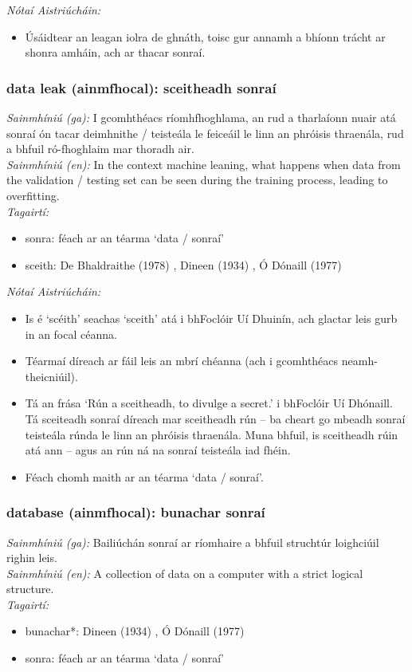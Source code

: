  \noindent \textit{Nótaí Aistriúcháin:}
\begin{itemize}
	\item Úsáidtear an leagan iolra de ghnáth, toisc gur annamh a bhíonn trácht ar shonra amháin, ach ar thacar sonraí.
\end{itemize}


\subsubsection*{data leak (ainmfhocal): sceitheadh sonraí}
 \noindent \textit{Sainmhíniú (ga):} I gcomhthéacs ríomhfhoghlama, an rud a tharlaíonn nuair atá sonraí ón tacar deimhnithe / teisteála le feiceáil le linn an phróisis thraenála, rud a bhfuil ró-fhoghlaim mar thoradh air.
\\
 \noindent \textit{Sainmhíniú (en):} In the context machine leaning, what happens when data from the validation / testing set can be seen during the training process, leading to overfitting.
\\
 \noindent \textit{Tagairtí:}
\begin{itemize}
	\item sonra: féach ar an téarma `data / sonraí'
	\item sceith: De Bhaldraithe (1978) \cite{de-bhaldraithe}, Dineen (1934) \cite{dineen}, Ó Dónaill (1977) \cite{odonaill}
\end{itemize}

 \noindent \textit{Nótaí Aistriúcháin:}
\begin{itemize}
	\item Is é `scéith' seachas `sceith' atá i bhFoclóir Uí Dhuinín, ach glactar leis gurb in an focal céanna.
	\item Téarmaí díreach ar fáil leis an mbrí chéanna (ach i gcomhthéacs neamh-theicniúil).
	\item Tá an frása `Rún a sceitheadh, to divulge a secret.' i bhFoclóir Uí Dhónaill. Tá sceiteadh sonraí díreach mar sceitheadh rún -- ba cheart go mbeadh sonraí teisteála rúnda le linn an phróisis thraenála. Muna bhfuil, is sceitheadh rúin atá ann -- agus an rún ná na sonraí teisteála iad fhéin.
	\item Féach chomh maith ar an téarma `data / sonraí'.
\end{itemize}


\subsubsection*{database (ainmfhocal): bunachar sonraí}
 \noindent \textit{Sainmhíniú (ga):} Bailiúchán sonraí ar ríomhaire a bhfuil struchtúr loighciúil righin leis.
\\
 \noindent \textit{Sainmhíniú (en):} A collection of data on a computer with a strict logical structure.
\\
 \noindent \textit{Tagairtí:}
\begin{itemize}
	\item bunachar*: Dineen (1934) \cite{dineen}, Ó Dónaill (1977) \cite{odonaill}
	\item sonra: féach ar an téarma `data / sonraí'
\end{itemize}

